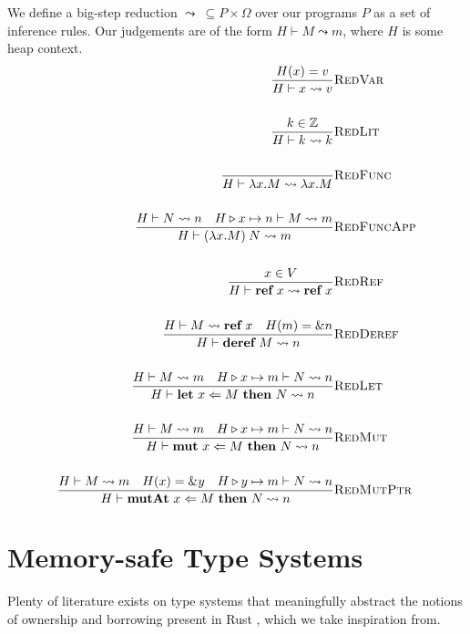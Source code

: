 \documentclass{article}
\newcommand{\agap}{\hspace{0.25em}}
\newcommand{\mkref}{\textbf{ref}~}
\newcommand{\deref}{\textbf{deref}~}%
\newcommand{\mutate}[3]{\textbf{mut}~ #1 \Leftarrow #2 ~\textbf{then}~ #3}
\newcommand{\mutptr}[3]{\textbf{mutAt}~ #1 \Leftarrow #2 ~\textbf{then}~ #3}
\newcommand{\letvar}[3]{\textbf{let}~ #1 \Leftarrow #2 ~\textbf{then}~ #3}
\newcommand{\red}{\leadsto}
\newcommand{\overwrite}{\triangleright}
\begin{document}
We define a big-step reduction $\red ~\subseteq P \times \Omega$ over our programs $P$ as a set of inference rules. Our judgements are of the form $H \vdash M \red m$, where $H$ is some heap context. 
\begin{align*}
    \frac{H(x) = v}{H \vdash x \red v}&\textsc{RedVar}\\
    ~\\
    \frac{k \in \mathbb{Z} }{H \vdash k \red k}&\textsc{RedLit}\\
    ~\\
    \frac{}{H \vdash \lambda x . M \red \lambda x . M}&\textsc{RedFunc}\\
    ~\\
    \frac{H \vdash N \red n \hspace{1em} H \overwrite x \mapsto n \vdash M \red m }{H \vdash (\lambda x . M) \agap N \red m}&\textsc{RedFuncApp}\\
    ~\\
    \frac{x \in V}{H \vdash \mkref x \red \mkref x}&\textsc{RedRef}\\
    ~\\
    \frac{H \vdash M \red \mkref x \hspace{1em} H(m) = \& n }{ H \vdash \deref M \red n }&\textsc{RedDeref}\\
    ~\\
    \frac{H \vdash M \red m \hspace{1em} H \overwrite x \mapsto m \vdash N \red n }{ H \vdash \letvar{x}{M}{N} \red n }&\textsc{RedLet}\\
    ~\\
    \frac{H \vdash M \red m \hspace{1em} H \overwrite x \mapsto m \vdash N \red n }{ H \vdash \mutate{x}{M}{N} \red n }&\textsc{RedMut}\\
    ~\\
    \frac{H \vdash M \red m \hspace{1em} H(x) = \&y \hspace{1em} H \overwrite y \mapsto m \vdash N \red n }{ H \vdash \mutptr{x}{M}{N} \red n }&\textsc{RedMutPtr}\\
\end{align*}

\section{Memory-safe Type Systems}

Plenty of literature exists on type systems that meaningfully abstract the notions of ownership and borrowing present in Rust \cite{marshall2022entente, marshall2024fracunique}, which we take inspiration from. 
\end{document}
